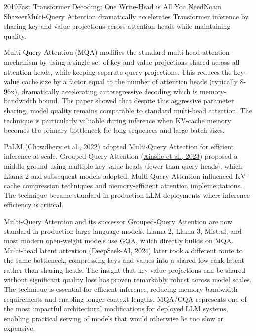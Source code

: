 
\begin{papersummary}{2019}{Fast Transformer Decoding: One Write-Head is All You Need}{Noam Shazeer}{Multi-Query Attention dramatically accelerates Transformer inference by sharing key and value projections across attention heads while maintaining quality.}

Multi-Query Attention (MQA) modifies the standard multi-head attention mechanism by using a single set of key and value projections shared across all attention heads, while keeping separate query projections. This reduces the key-value cache size by a factor equal to the number of attention heads (typically 8-96x), dramatically accelerating autoregressive decoding which is memory-bandwidth bound. The paper showed that despite this aggressive parameter sharing, model quality remains comparable to standard multi-head attention. The technique is particularly valuable during inference when KV-cache memory becomes the primary bottleneck for long sequences and large batch sizes.

PaLM (\hyperref[paper:chowdhery-2022]{Chowdhery et al., 2022}) adopted Multi-Query Attention for efficient inference at scale. Grouped-Query Attention (\hyperref[paper:ainslie-2023-gqa]{Ainslie et al., 2023}) proposed a middle ground using multiple key-value heads (fewer than query heads), which Llama 2 and subsequent models adopted. Multi-Query Attention influenced KV-cache compression techniques and memory-efficient attention implementations. The technique became standard in production LLM deployments where inference efficiency is critical.

Multi-Query Attention and its successor Grouped-Query Attention are now standard in production large language models. Llama 2, Llama 3, Mistral, and most modern open-weight models use GQA, which directly builds on MQA. Multi-head latent attention (\hyperref[paper:deepseek-2024-v2]{DeepSeek-AI, 2024}) later took a different route to the same bottleneck, compressing keys and values into a shared low-rank latent rather than sharing heads. The insight that key-value projections can be shared without significant quality loss has proven remarkably robust across model scales. The technique is essential for efficient inference, reducing memory bandwidth requirements and enabling longer context lengths. MQA/GQA represents one of the most impactful architectural modifications for deployed LLM systems, enabling practical serving of models that would otherwise be too slow or expensive.

\end{papersummary}
